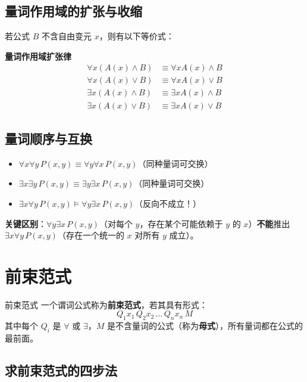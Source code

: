\subsection{量词作用域的扩张与收缩}

若公式 $B$ 不含自由变元 $x$，则有以下等价式：

\begin{myformula}
\textbf{量词作用域扩张律}
\[
\begin{aligned}
\forall x (A(x) \land B) &\equiv \forall x A(x) \land B \\
\forall x (A(x) \lor B) &\equiv \forall x A(x) \lor B \\
\exists x (A(x) \land B) &\equiv \exists x A(x) \land B \\
\exists x (A(x) \lor B) &\equiv \exists x A(x) \lor B
\end{aligned}
\]
\end{myformula}

\subsection{量词顺序与互换}

\begin{itemize}
\item $\forall x \forall y \, P(x,y) \equiv \forall y \forall x \, P(x,y)$（同种量词可交换）
\item $\exists x \exists y \, P(x,y) \equiv \exists y \exists x \, P(x,y)$（同种量词可交换）
\item $\exists x \forall y \, P(x,y) \models \forall y \exists x \, P(x,y)$（反向不成立！）
\end{itemize}

\textbf{关键区别}：$\forall y \exists x \, P(x,y)$（对每个 $y$，存在某个可能依赖于 $y$ 的 $x$）\textbf{不能}推出 $\exists x \forall y \, P(x,y)$（存在一个统一的 $x$ 对所有 $y$ 成立）。

\section{前束范式}

\begin{mydefinition}{前束范式}
一个谓词公式称为\textbf{前束范式}，若其具有形式：
\[Q_1 x_1 \, Q_2 x_2 \, \dots \, Q_n x_n \, M\]
其中每个 $Q_i$ 是 $\forall$ 或 $\exists$，$M$ 是不含量词的公式（称为\textbf{母式}），所有量词都在公式的最前面。
\end{mydefinition}

\subsection{求前束范式的四步法}

